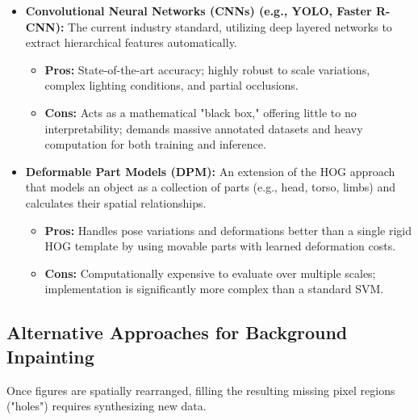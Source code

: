 \documentclass[12pt]{article}
\begin{document}
\begin{itemize}
    \item \textbf{Convolutional Neural Networks (CNNs) (e.g., YOLO, Faster R-CNN):} The current industry standard, utilizing deep layered networks to extract hierarchical features automatically.
    \begin{itemize}
        \item \textbf{Pros:} State-of-the-art accuracy; highly robust to scale variations, complex lighting conditions, and partial occlusions.
        \item \textbf{Cons:} Acts as a mathematical "black box," offering little to no interpretability; demands massive annotated datasets and heavy computation for both training and inference.
    \end{itemize}

    \item \textbf{Deformable Part Models (DPM):} An extension of the HOG approach that models an object as a collection of parts (e.g., head, torso, limbs) and calculates their spatial relationships.
    \begin{itemize}
        \item \textbf{Pros:} Handles pose variations and deformations better than a single rigid HOG template by using movable parts with learned deformation costs.
        \item \textbf{Cons:} Computationally expensive to evaluate over multiple scales; implementation is significantly more complex than a standard SVM.
    \end{itemize}
\end{itemize}

\subsection*{Alternative Approaches for Background Inpainting}
Once figures are spatially rearranged, filling the resulting missing pixel regions ("holes") requires synthesizing new data.
\end{document}

